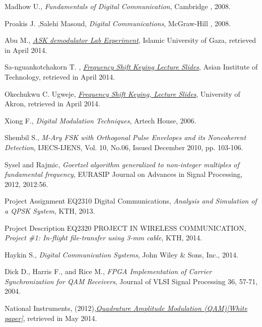 \documentclass[12pt,a4paper,openright]{report}
\begin{document}
\begin{thebibliography}{1}

Madhow U., \emph{Fundamentals of Digital Communication}, Cambridge , 2008.

Proakis J. ,Salehi Masoud, \emph{Digital Communications}, McGraw-Hill , 2008.

Abu M., \href{http://site.iugaza.edu.ps/mabufoul/files/2010/09/Experiment-5.pdf}
{\emph{ASK demodulator Lab Experiment}},
Islamic University of Gaza, retrieved in April 2014.


Sa-nguankotchakorn T. , \href{http://www.tc.ait.ac.th/faculty/teerapat/AT77.11_Digital\%20Modulation\%20Techniques/III.Frequency_Shift_Keying.pdf}{\emph{Frequency Shift Keying Lecture Slides}}, Asian Institute of Technology, retrieved in April 2014.


Okechukwu C. Ugweje, \href{ugweje/web/Courses/Ee549/Handout/EE549F01Lecture37.pdf}{\emph{Frequency Shift Keying, Lecture Slides}},  University of Akron, retrieved in April 2014.


Xiong F., \emph{Digital Modulation Techniques}, Artech House, 2006.

Shembil S., \emph{M-Ary FSK with Orthogonal Pulse Envelopes and its Noncoherent Detection}, IJECS-IJENS, Vol. 10, No.06, Issued December 2010, pp. 103-106.

Sysel and Rajmic, \emph{Goertzel algorithm generalized to non-integer multiples of fundamental frequency}, EURASIP Journal on Advances in Signal Processing, 2012, 2012:56.

Project Assignment EQ2310 Digital Communications, \emph{Analysis and Simulation of a QPSK System}, KTH, 2013.

Project Description EQ2320 PROJECT IN WIRELESS COMMUNICATION, \emph{Project \#1: In-flight file-transfer using 3-mm cable}, KTH, 2014.

Haykin S., \emph{Digital Communication Systems}, John Wiley \& Sons, Inc., 2014.

Dick D., Harris F., and Rice M., \emph{FPGA Implementation of Carrier Synchronization for QAM Receivers}, Journal of VLSI Signal Processing 36, 57-71, 2004.

National Instruments, (2012),\href{http://www.ni.com/white-paper/3896/en/}{\emph{Quadrature Amplitude Modulation (QAM)[White paper]}}, retrieved in May 2014.


\end{thebibliography}
\end{document}
